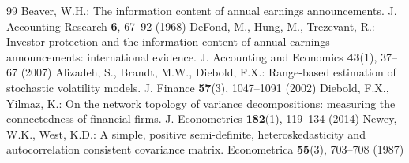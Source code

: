 \documentclass[runningheads]{llncs}
\begin{document}
\begin{thebibliography}{99}
 Beaver, W.H.: The information content of annual earnings announcements. J. Accounting Research \textbf{6}, 67--92 (1968)
 DeFond, M., Hung, M., Trezevant, R.: Investor protection and the information content of annual earnings announcements: international evidence. J. Accounting and Economics \textbf{43}(1), 37--67 (2007)
 Alizadeh, S., Brandt, M.W., Diebold, F.X.: Range-based estimation of stochastic volatility models. J. Finance \textbf{57}(3), 1047--1091 (2002)
 Diebold, F.X., Yilmaz, K.: On the network topology of variance decompositions: measuring the connectedness of financial firms. J. Econometrics \textbf{182}(1), 119--134 (2014)
 Newey, W.K., West, K.D.: A simple, positive semi-definite, heteroskedasticity and autocorrelation consistent covariance matrix. Econometrica \textbf{55}(3), 703--708 (1987)
\end{thebibliography}
\end{document}
